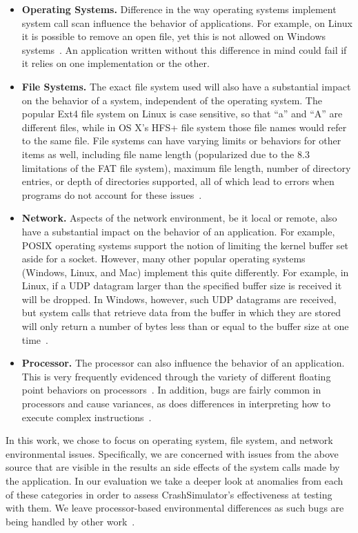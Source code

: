 \begin{itemize}

\item {\bf Operating Systems.} Difference in the way operating systems
implement system call scan influence the behavior of applications.  For
example, on Linux it is possible to remove an open file, yet this is not
allowed on Windows systems~\cite{UnlinkStandard}.  An application
written without this difference in mind could fail if it relies on one
implementation or the other.

\item {\bf File Systems.}  The exact file system used will also have a
substantial impact on the behavior of a system, independent of the
operating system.  The popular Ext4 file system on Linux is case sensitive,
so that ``a'' and ``A'' are different files, while in OS X's HFS+ file system
those file names would refer to the same file.
File systems can have varying limits or behaviors for other items as well,
including file name length (popularized due to the 8.3 limitations of the
FAT file system), maximum file length, number of directory entries, or
depth
of directories supported, all of which lead to errors when programs
do not account for these issues~\cite{EXT4Layout, AppleHFS}.

\item {\bf Network.}  Aspects of the network environment, be it local or
remote, also have a
substantial impact on the behavior of an application.
For example, POSIX operating
systems support the notion of limiting the kernel buffer set aside for a
socket.  However, many other popular operating
systems (Windows, Linux, and Mac)
implement this quite differently.  For example, in Linux, if a UDP datagram
larger than the specified buffer size is received it will be dropped.  In
Windows, however, such
UDP datagrams are
received, but system calls that retrieve data from the buffer in which
they are
stored will only return a number of bytes less than or equal to the
buffer size at one time~\cite{Zhuang_NSDI_2014}.

\item {\bf Processor.}  The processor can also influence the
behavior of an application.  This is very frequently
evidenced through the variety of different floating point behaviors on
processors~\cite{ArbitraryPrecision}.  In addition, bugs are fairly common
in processors and cause variances, as does differences in interpreting
how to execute complex instructions~\cite{Microarch}.

\end{itemize}

In this work, we chose to focus on operating system,
file system, and network
environmental issues.
Specifically, we are concerned with issues from the above source that are
visible in the results an side effects of the system calls made by the
application.  In our evaluation we take a deeper look at anomalies from
each of these categories in order to assess CrashSimulator's effectiveness
at testing with them.
We leave processor-based environmental differences as such
bugs are being handled by other
work~\cite{Alglave:2018:FSC:3173162.3177156}.
